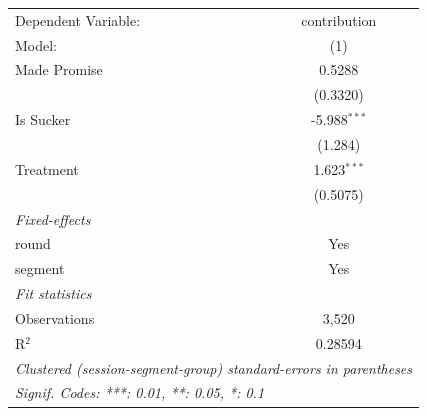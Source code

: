 
\begingroup
\centering
\begin{tabular}{lc}
   \tabularnewline \midrule \midrule
   Dependent Variable: & contribution\\  
   Model:              & (1)\\  
   \midrule
   Made Promise        & 0.5288\\   
                       & (0.3320)\\   
   Is Sucker           & -5.988$^{***}$\\   
                       & (1.284)\\   
   Treatment           & 1.623$^{***}$\\   
                       & (0.5075)\\   
   \midrule
   \emph{Fixed-effects}\\
   round               & Yes\\  
   segment             & Yes\\  
   \midrule
   \emph{Fit statistics}\\
   Observations        & 3,520\\  
   R$^2$               & 0.28594\\  
   \midrule \midrule
   \multicolumn{2}{l}{\emph{Clustered (session-segment-group) standard-errors in parentheses}}\\
   \multicolumn{2}{l}{\emph{Signif. Codes: ***: 0.01, **: 0.05, *: 0.1}}\\
\end{tabular}
\par\endgroup


